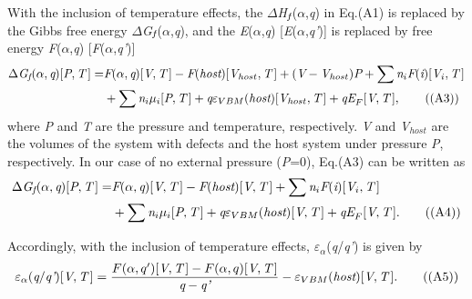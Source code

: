 \documentclass[onecolumn,preprint,superscriptaddress]{revtex4-1}
\begin{document}
With the inclusion of temperature effects, the $\Delta$\emph{H}$_{\emph{f}}$(\emph{$\alpha$},\emph{q}) in Eq.(A1) is replaced by the Gibbs free energy $\Delta$\emph{G}$_{\emph{f}}$(\emph{$\alpha$},\emph{q}), and the \emph{E}($\alpha$,\emph{q}) [\emph{E}($\alpha$,\emph{q'})] is replaced by free energy \emph{F}($\alpha$,\emph{q}) [\emph{F}($\alpha$,\emph{q'})]
\begin{align}
\Delta\emph{G}_{\emph{f}}(\alpha,\emph{q})[\emph{P},\emph{T}\,]=&\emph{F}(\alpha,\emph{q})[\emph{V},\emph{T}\,]
-\emph{F}(\emph{host})[\emph{V}_{host},\emph{T}\,]+(\emph{V}-\emph{V}_{host})\emph{P}+
\sum\emph{n}_i\emph{F}(\emph{i})[\emph{V}_i,\emph{T}\,]\nonumber \\
&+\sum\emph{n}_i\mu_i[\emph{P},\emph{T}\,]+\emph{q}\varepsilon_{VBM}(\emph{host})[\emph{V}_{host},\emph{T}\,]+\emph{qE}_F[\emph{V},\emph{T}\,], \tag{(A3)}
\end{align}
\noindent where \emph{P} and \emph{T} are the pressure and temperature, respectively. \emph{V} and \emph{V}$_{host}$ are the volumes of the system with defects and the host system under pressure \emph{P}, respectively. In our case of no external pressure (\emph{P}=0), Eq.(A3) can be written as
\begin{align}
\Delta\emph{G}_{\emph{f}}(\alpha,\emph{q})[\emph{P},\emph{T}\,]=&\emph{F}(\alpha,\emph{q})[\emph{V},\emph{T}\,]
-\emph{F}(\emph{host})[\emph{V},\emph{T}\,]+\sum\emph{n}_i\emph{F}(\emph{i})[\emph{V}_i,\emph{T}\,]\nonumber \\
&+\sum\emph{n}_i\mu_i[\emph{P},\emph{T}\,]+\emph{q}\varepsilon_{VBM}(\emph{host})[\emph{V},\emph{T}\,]+\emph{qE}_F[\emph{V},\emph{T}\,]. \tag{(A4)}
\end{align}

Accordingly, with the inclusion of temperature effects, $\varepsilon$$_{\alpha}$(\emph{q}/\emph{q'}) is given by
\begin{equation}
\varepsilon_{\alpha}(\emph{q}/\emph{q'})[\emph{V},\emph{T}\,] = \frac{F(\alpha,q')[\emph{V},\emph{T}\,]-F(\alpha,q)[\emph{V},\emph{T}\,]}{\emph{q}-\emph{q'}}
-\varepsilon_{VBM}(\emph{host})[\emph{V},\emph{T}\,].  \tag{(A5)}
\end{equation}
\end{document}
